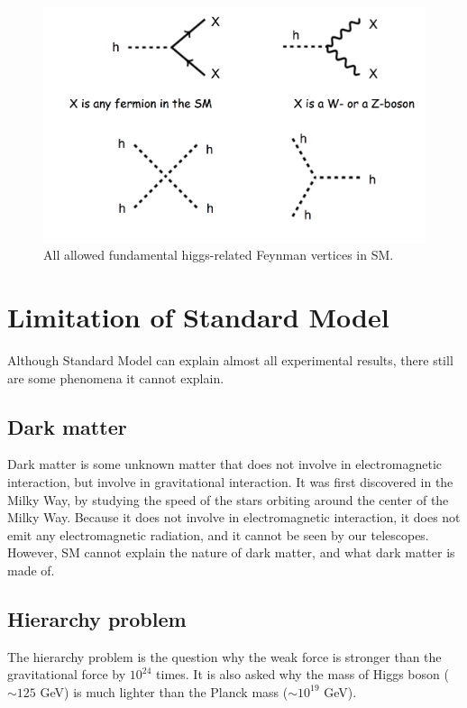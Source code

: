 \begin{figure}
\centering
\includegraphics[width=\textwidth]{data/photo/theory/vertices_higgs.png}
\caption{All allowed fundamental higgs-related Feynman vertices in SM.}
\label{fig:vertices_higgs}
\end{figure}

\section{Limitation of Standard Model}
\label{sec:Limitation_Standard_Model}
Although Standard Model can explain almost all experimental results, there still are some phenomena it cannot explain.

\subsection{Dark matter}
\label{sec:dark_matter}
Dark matter is some unknown matter that does not involve in electromagnetic interaction, but involve in gravitational interaction.
It was first discovered in the Milky Way, by studying the speed of the stars orbiting around the center of the Milky Way.
Because it does not involve in electromagnetic interaction, it does not emit any electromagnetic radiation, and it cannot be seen by our telescopes.
However, SM cannot explain the nature of dark matter, and what dark matter is made of.

\subsection{Hierarchy problem}
\label{subsec:hierarchy_problem}
The hierarchy problem is the question why the weak force is stronger than the gravitational force by $10^{24}$ times.
It is also asked why the mass of Higgs boson ($\sim 125$ GeV) is much lighter than the Planck mass ($\sim 10^{19}$ GeV).

